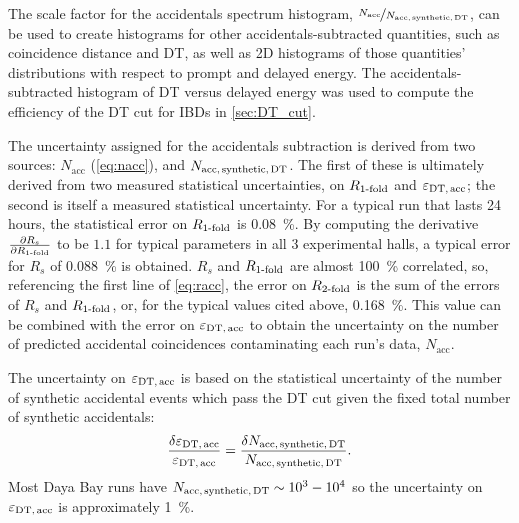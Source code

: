 
The scale factor for the accidentals spectrum histogram,
$\nicefrac{N_{\text{acc}}}{N_{\text{acc,\,synthetic,\,DT}}}$,
can be used to create histograms for other accidentals-subtracted quantities,
such as coincidence distance and DT, as well as 2D histograms of
those quantities' distributions with respect to prompt and delayed energy.
The accidentals-subtracted histogram of DT versus delayed energy
was used to compute the efficiency of the DT cut for IBDs in \cref{sec:DT_cut}.

The uncertainty assigned for the accidentals subtraction
is derived from two sources: $N_{\text{acc}}$ (\cref{eq:nacc}),
and $N_{\text{acc,\,synthetic,\,DT}}$.
The first of these is ultimately derived from
two measured statistical uncertainties,
on $R_{\text{\ensuremath{1}-fold}}$ and $\varepsilon_{\text{DT,\,acc}}$;
the second is itself a measured statistical uncertainty.
For a typical run that lasts 24 hours,
the statistical error on $R_{\text{\ensuremath{1}-fold}}$ is \SI{0.08}{\percent}.
By computing the derivative $\frac{\partial R_s}{\partial R_{\text{\ensuremath{1}-fold}}}$
to be $1.1$ for typical parameters in all 3 experimental halls,
a typical error for $R_s$ of \SI{0.088}{\percent} is obtained.
$R_s$ and $R_{\text{\ensuremath{1}-fold}}$ are almost \SI{100}{\percent} correlated,
so, referencing the first line of \cref{eq:racc},
the error on $R_{\text{\ensuremath{2}-fold}}$ is the sum of the errors
of $R_s$ and $R_{\text{\ensuremath{1}-fold}}$,
or, for the typical values cited above, \SI{0.168}{\percent}.
This value can be combined with the error on $\varepsilon_{\text{DT,\,acc}}$
to obtain the uncertainty on the number of predicted accidental coincidences
contaminating each run's data, $N_{\text{acc}}$.

The uncertainty on $\varepsilon_{\text{DT,\,acc}}$ is based on
the statistical uncertainty of the number of synthetic accidental events
which pass the DT cut given the fixed total number of synthetic accidentals:
\begin{equation}
    \frac{\delta\varepsilon_{\text{DT,\,acc}}}{\varepsilon_{\text{DT,\,acc}}}
    = \frac{\delta N_{\text{acc,\,synthetic,\,DT}}}{
        N_{\text{acc,\,synthetic,\,DT}}
    }.
\end{equation}
Most Daya Bay runs have $N_{\text{acc,\,synthetic,\,DT}}\sim10^3-10^4$
so the uncertainty on $\varepsilon_{\text{DT,\,acc}}$ is approximately \SI{1}{\percent}.

